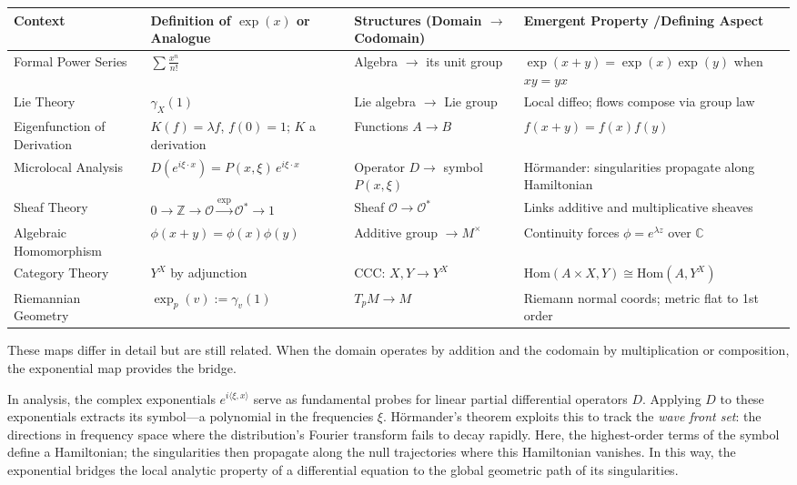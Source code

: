 \begin{center}
\renewcommand{\arraystretch}{1.5}
\setlength{\tabcolsep}{2pt}
\footnotesize
\begin{tabular}{|>{\centering\arraybackslash}m{2.0cm}|>{\centering\arraybackslash}m{2.8cm}|>{\centering\arraybackslash}m{3.8cm}|>{\centering\arraybackslash}m{4.2cm}|}
\hline
\textbf{Context} &
\textbf{Definition of \( \exp(x) \) or Analogue} &
\textbf{Structures (Domain \( \to \) Codomain)} &
\textbf{Emergent Property /\newline Defining Aspect} \\
\hline
Formal Power Series &
\( \sum \frac{x^n}{n!} \) &
Algebra \( \to \) its unit group &
\( \exp(x+y) = \exp(x)\exp(y) \) when \( xy = yx \) \\
\hline
Lie Theory &
\( \gamma_X(1) \) &
Lie algebra \( \to \) Lie group &
Local diffeo; flows compose via group law \\
\hline
Eigenfunction of Derivation &
\( K(f) = \lambda f \), \( f(0) = 1 \); \( K \) a derivation &
Functions \( A \to B \) &
\( f(x+y) = f(x)f(y) \) \\
\hline
Microlocal Analysis &
\( D(e^{i\xi \cdot x}) = P(x,\xi)\,e^{i\xi \cdot x} \) &
Operator \( D \to \) symbol \( P(x,\xi) \) &
Hörmander: singularities propagate along Hamiltonian\\
\hline
Sheaf Theory &
\( 0 \to \mathbb{Z} \to \mathcal{O} \xrightarrow{\exp} \mathcal{O}^* \to 1 \) &
Sheaf \( \mathcal{O} \to \mathcal{O}^* \) &
Links additive and multiplicative sheaves \\
\hline
Algebraic Homomorphism &
\( \phi(x+y) = \phi(x)\phi(y) \) &
Additive group \( \to M^\times \) &
Continuity forces \( \phi = e^{\lambda z} \) over \( \mathbb{C} \) \\
\hline
Category Theory &
\( Y^X \) by adjunction &
CCC: \( X, Y \to Y^X \) &
\( \mathrm{Hom}(A \times X, Y) \cong \mathrm{Hom}(A, Y^X) \) \\
\hline
Riemannian Geometry &
\( \exp_p(v) := \gamma_v(1) \) &
\( T_p M \to M \) &
Riemann normal coords; metric flat to 1st order \\
\hline
\end{tabular}
\end{center}

These maps differ in detail but are still related. When the domain operates by addition and the codomain by multiplication or composition, the exponential map provides the bridge.

In analysis, the complex exponentials \( e^{i\langle \xi, x \rangle} \) serve as fundamental probes for linear partial differential operators \( D \). Applying \( D \) to these exponentials extracts its symbol—a polynomial in the frequencies \( \xi \). Hörmander's theorem exploits this to track the \textit{wave front set}: the directions in frequency space where the distribution's Fourier transform fails to decay rapidly. Here, the highest-order terms of the symbol define a Hamiltonian; the singularities then propagate along the \QSOpen{}null\QSClose{} trajectories where this Hamiltonian vanishes. In this way, the exponential bridges the local analytic property of a differential equation to the global geometric path of its singularities.


